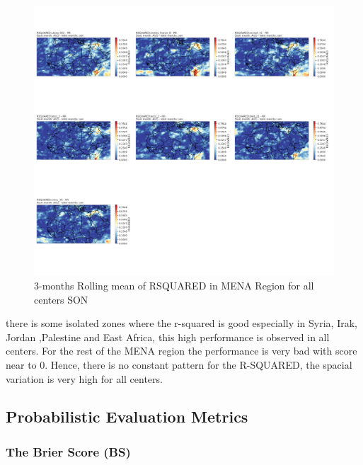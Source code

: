 \begin{figure}[H]
\includegraphics[scale=0.3]{plots/det/rsquared/rsquared_son_RR.png}
\caption{3-months Rolling mean of RSQUARED in MENA Region for all centers SON}
\end{figure}

there is some isolated zones where the r-squared is good especially in Syria, Irak, Jordan ,Palestine  and East Africa, this high performance is observed in all centers. For the rest of the MENA region the performance is very bad with score near to 0. Hence, there is no constant pattern for the R-SQUARED, the spacial variation is very high for all centers.


\subsection{Probabilistic Evaluation Metrics}

\subsubsection{The Brier Score (BS)}

